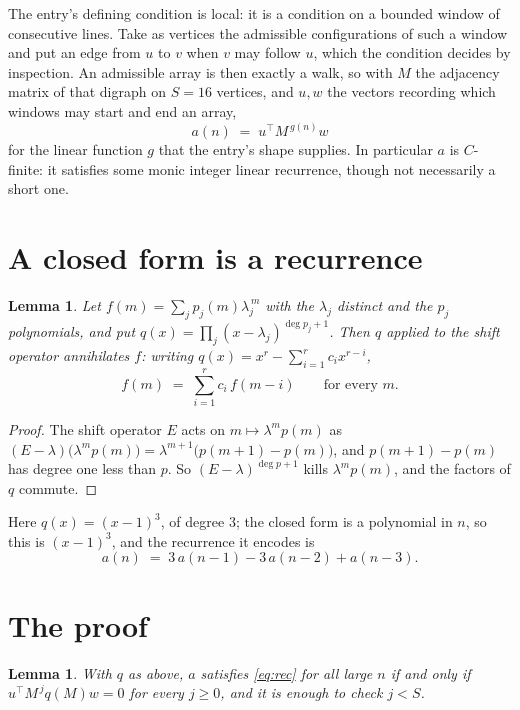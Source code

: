 \documentclass[11pt,a4paper]{article}
\theoremstyle{plain}
\newtheorem{lemma}[theorem]{Lemma}
\theoremstyle{definition}
\begin{document}
The entry's defining condition is local: it is a condition on a bounded window of consecutive lines. Take as vertices the
admissible configurations of such a window and put an edge from $u$ to $v$ when $v$ may
follow $u$, which the condition decides by inspection. An admissible array is then exactly a
walk, so with $M$ the adjacency matrix of that digraph on $S=16$ vertices, and $u,w$ the
vectors recording which windows may start and end an array,
\[
a(n)\;=\;u^{\!\top}M^{\,g(n)}w
\]
for the linear function $g$ that the entry's shape supplies. In particular $a$ is
$C$-finite: it satisfies some monic integer linear recurrence, though not necessarily a short
one.

\section{A closed form is a recurrence}

\begin{lemma}\label{lem:ann}
Let $f(m)=\sum_{j}p_j(m)\lambda_j^{\,m}$ with the $\lambda_j$ distinct and the $p_j$
polynomials, and put $q(x)=\prod_j(x-\lambda_j)^{\deg p_j+1}$. Then $q$ applied to the shift
operator annihilates $f$: writing $q(x)=x^{r}-\sum_{i=1}^{r}c_ix^{r-i}$,
\[
f(m)\;=\;\sum_{i=1}^{r}c_i\,f(m-i)\qquad\text{for every }m.
\]
\end{lemma}

\begin{proof}
The shift operator $E$ acts on $m\mapsto\lambda^{m}p(m)$ as
$(E-\lambda)\bigl(\lambda^{m}p(m)\bigr)=\lambda^{m+1}\bigl(p(m+1)-p(m)\bigr)$, and
$p(m+1)-p(m)$ has degree one less than $p$. So $(E-\lambda)^{\deg p+1}$ kills
$\lambda^{m}p(m)$, and the factors of $q$ commute.
\end{proof}

Here $q(x)=(x-1)^{3}$, of degree $3$; the closed form is a polynomial in $n$, so this is $(x-1)^{3}$, and the recurrence it encodes is
\begin{equation}\label{eq:rec}
a(n)\;=\;3\,a(n-1) - 3\,a(n-2) + a(n-3).
\end{equation}

\section{The proof}

\begin{lemma}\label{lem:crit}
With $q$ as above, $a$ satisfies \eqref{eq:rec} for all large $n$ if and only if
$u^{\!\top}M^{\,j}q(M)w=0$ for every $j\ge0$, and it is enough to check $j<S$.
\end{lemma}
\end{document}
